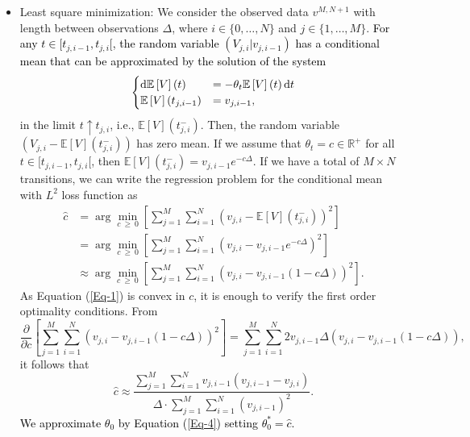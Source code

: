 \documentclass[11pt]{article}
\theoremstyle{definition}
\newcommand{\red}{\textcolor{black}}
\newcommand{\E}{\mathbb{E}}
\newcommand{\R}{\mathbb{R}}
\begin{document}
\begin{itemize}
\item {Least square minimization:} We consider the observed data $v^{M,N+1}$ with length between observations $\Delta$, where $i\in\{0,\dots,N\}$ and $j\in\{1,\dots,M\}$. \red{For any $t\in [t_{j,i-1}, t_{j, i}[$, the random variable $(V_{j,i}|v_{j,i-1})$ has a conditional mean that can be approximated by the solution of the system}
\begin{equation*}
\begin{cases}
\dif \E\left[V\right](t)&=-\theta_t\E\left[V\right](t)\dif t\\
\E\left[V\right](t_{j,i-1})&=v_{j,i-1},
\end{cases}
\end{equation*}
in the limit $t\uparrow t_{j,i}$, i.e., $\E\left[V\right](t_{j,i}^-)$. Then, the random variable $(V_{j,i}-\E\left[V\right](t_{j,i}^-))$ has zero mean. If we assume that $\theta_t=c\in\R^+$ for all $t\in[t_{j,i-1},t_{j,i}[$, then $\E\left[V\right](t_{j,i}^-)=v_{j,i-1}e^{-c\Delta}$. If we have a total of $M\times N$ transitions, we can write the regression problem for the conditional mean with $L^2$ loss function as
\begin{equation}
\begin{split}
\hat{c}&=\arg\min_{c\ \geq\ 0}\left[\sum_{j=1}^M\sum_{i=1}^{N}\left(v_{j,i}-\E\left[V\right](t_{j,i}^-)\right)^2\right]\\
&=\arg\min_{c\ \geq\ 0}\left[\sum_{j=1}^M\sum_{i=1}^{N}\left(v_{j,i}-v_{j,i-1}e^{-c\Delta}\right)^2\right]\\
&\approx\arg\min_{c\ \geq\ 0}\left[\sum_{j=1}^M\sum_{i=1}^{N}\left(v_{j,i}-v_{j,i-1}(1-c\Delta)\right)^2\right].
\end{split}
\label{Eq-1}
\end{equation}
As Equation (\ref{Eq-1}) is convex in $c$, it is enough to verify the first order optimality conditions. From
\begin{equation*}
\frac{\partial}{\partial c}\left[\sum_{j=1}^M\sum_{i=1}^{N}\left(v_{j,i}-v_{j,i-1}(1-c\Delta)\right)^2\right]=\sum_{j=1}^M\sum_{i=1}^{N}2v_{j,i-1}\Delta\left(v_{j,i}-v_{j,i-1}(1-c\Delta)\right),
\end{equation*}
it follows that
\begin{equation}
\hat{c}\approx\frac{\sum_{j=1}^M\sum_{i=1}^{N}v_{j,i-1}(v_{j,i-1}-v_{j,i})}{\Delta\cdot\sum_{j=1}^M\sum_{i=1}^{N}(v_{j,i-1})^2}.
\label{Eq-4}
\end{equation}
\red{We approximate $\theta_0$ by Equation (\ref{Eq-4}) setting $\theta_0^*=\hat{c}$.}


\end{itemize}
\end{document}
